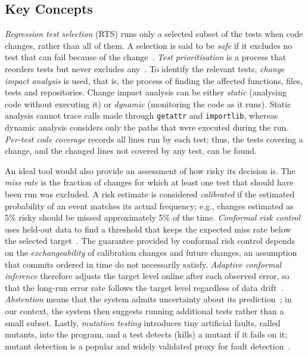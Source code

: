 \documentclass[conference]{IEEEtran}
\begin{document}
\subsection{Key Concepts}
\textit{Regression test selection} (RTS) runs only a selected subset of the tests when code changes, rather than all of them. A selection is said to be \textit{safe} if it excludes no test that can fail because of the change~\cite{yoo2012survey}. \textit{Test prioritisation} is a process that reorders tests but never excludes any~\cite{yoo2012survey}. To identify the relevant tests, \textit{change impact analysis} is used, that is, the process of finding the affected functions, files, tests and repositories. Change impact analysis can be either \textit{static} (analysing code without executing it) or \textit{dynamic} (monitoring the code as it runs). Static analysis cannot trace calls made through \texttt{getattr} and \texttt{importlib}, whereas dynamic analysis considers only the paths that were executed during the run. \textit{Per-test code coverage} records all lines run by each test; thus, the tests covering a change, and the changed lines not covered by any test, can be found.

An ideal tool would also provide an assessment of how risky its decision is. The \textit{miss rate} is the fraction of changes for which at least one test that should have been run was excluded. A risk estimate is considered \textit{calibrated} if the estimated probability of an event matches its actual frequency; e.g., changes estimated as 5\% risky should be missed approximately 5\% of the time. \textit{Conformal risk control} uses held-out data to find a threshold that keeps the expected miss rate below the selected target~\cite{angelopoulos2024crc}. The guarantee provided by conformal risk control depends on the \textit{exchangeability} of calibration changes and future changes, an assumption that commits ordered in time do not necessarily satisfy. \textit{Adaptive conformal inference} therefore adjusts the target level online after each observed error, so that the long-run error rate follows the target level regardless of data drift~\cite{gibbs2021aci}. \textit{Abstention} means that the system admits uncertainty about its prediction~\cite{yadkori2024abstention}; in our context, the system then suggests running additional tests rather than a small subset. Lastly, \textit{mutation testing} introduces tiny artificial faults, called mutants, into the program, and a test detects (kills) a mutant if it fails on it; mutant detection is a popular and widely validated proxy for fault detection~\cite{jia2011mutation,just2014mutants}.
\end{document}
